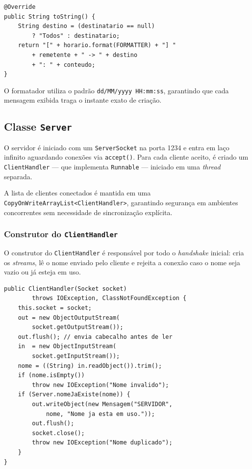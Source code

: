 \documentclass[10pt,twocolumn,a4paper]{article}
\begin{document}
\begin{lstlisting}[caption={toString() da classe Mensagem}]
@Override
public String toString() {
    String destino = (destinatario == null)
        ? "Todos" : destinatario;
    return "[" + horario.format(FORMATTER) + "] "
        + remetente + " -> " + destino
        + ": " + conteudo;
}
\end{lstlisting}

O formatador utiliza o padrão \texttt{dd/MM/yyyy HH:mm:ss}, garantindo que
cada mensagem exibida traga o instante exato de criação.

\subsection{Classe \texttt{Server}}

O servidor é iniciado com um \texttt{ServerSocket} na porta 1234 e entra em
laço infinito aguardando conexões via \texttt{accept()}. Para cada cliente
aceito, é criado um \texttt{ClientHandler} — que implementa \texttt{Runnable}
— iniciado em uma \textit{thread} separada.

A lista de clientes conectados é mantida em uma
\texttt{CopyOnWriteArrayList<ClientHandler>}, garantindo segurança em ambientes
concorrentes sem necessidade de sincronização explícita.

\subsubsection{Construtor do \texttt{ClientHandler}}

O construtor do \texttt{ClientHandler} é responsável por todo o
\textit{handshake} inicial: cria os \textit{streams}, lê o nome enviado pelo
cliente e rejeita a conexão caso o nome seja vazio ou já esteja em uso.

\begin{lstlisting}[caption={Handshake no ClientHandler}]
public ClientHandler(Socket socket)
        throws IOException, ClassNotFoundException {
    this.socket = socket;
    out = new ObjectOutputStream(
        socket.getOutputStream());
    out.flush(); // envia cabecalho antes de ler
    in  = new ObjectInputStream(
        socket.getInputStream());
    nome = ((String) in.readObject()).trim();
    if (nome.isEmpty())
        throw new IOException("Nome invalido");
    if (Server.nomeJaExiste(nome)) {
        out.writeObject(new Mensagem("SERVIDOR",
            nome, "Nome ja esta em uso."));
        out.flush();
        socket.close();
        throw new IOException("Nome duplicado");
    }
}
\end{lstlisting}
\end{document}
